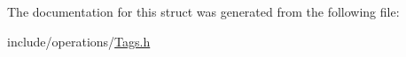 The documentation for this struct was generated from the following file\+:\begin{DoxyCompactItemize}
\item 
include/operations/\hyperlink{operations_2Tags_8h}{Tags.\+h}\end{DoxyCompactItemize}
